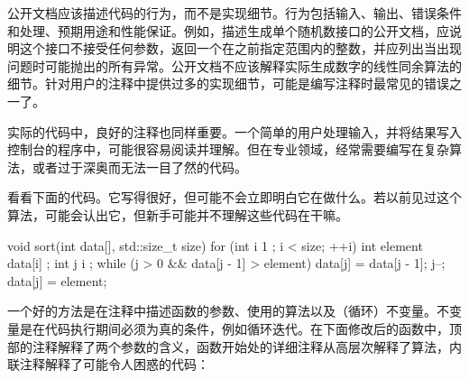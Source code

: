 公开文档应该描述代码的行为，而不是实现细节。行为包括输入、输出、错误条件和处理、预期用途和性能保证。例如，描述生成单个随机数接口的公开文档，应说明这个接口不接受任何参数，返回一个在之前指定范围内的整数，并应列出当出现问题时可能抛出的所有异常。公开文档不应该解释实际生成数字的线性同余算法的细节。针对用户的注释中提供过多的实现细节，可能是编写注释时最常见的错误之一了。


实际的代码中，良好的注释也同样重要。一个简单的用户处理输入，并将结果写入控制台的程序中，可能很容易阅读并理解。但在专业领域，经常需要编写在复杂算法，或者过于深奥而无法一目了然的代码。

看看下面的代码。它写得很好，但可能不会立即明白它在做什么。若以前见过这个算法，可能会认出它，但新手可能并不理解这些代码在干嘛。

\begin{cpp}
void sort(int data[], std::size_t size)
{
    for (int i { 1 }; i < size; ++i) {
        int element { data[i] };
        int j { i };
        while (j > 0 && data[j - 1] > element) {
            data[j] = data[j - 1];
            j--;
        }
        data[j] = element;
    }
}
\end{cpp}

一个好的方法是在注释中描述函数的参数、使用的算法以及（循环）不变量。不变量是在代码执行期间必须为真的条件，例如循环迭代。在下面修改后的函数中，顶部的注释解释了两个参数的含义，函数开始处的详细注释从高层次解释了算法，内联注释解释了可能令人困惑的代码：

